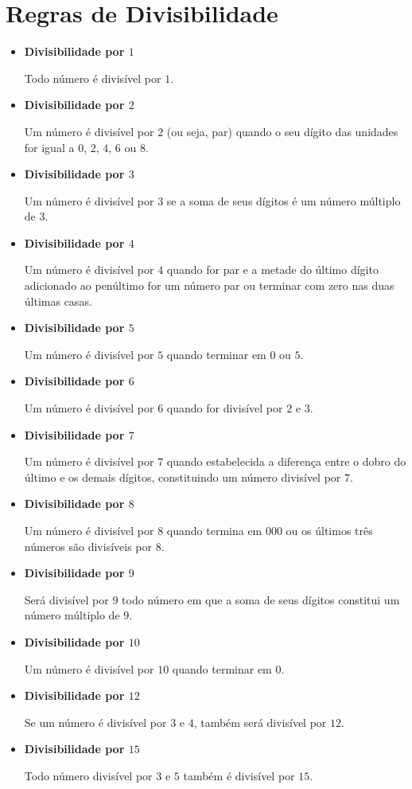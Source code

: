  \newpage
 \section{Regras de Divisibilidade}
 \begin{itemize}
  \item \textbf{Divisibilidade por $1$}

 Todo número é divisível por $1$.

 \item \textbf{Divisibilidade por $2$}

 Um número é divisível por $2$ (ou seja, par) quando o seu dígito das unidades for igual a $0$, $2$, $4$, $6$ ou $8$.

 \item \textbf{Divisibilidade por $3$}

 Um número é divisível por $3$ se a soma de seus dígitos é um número múltiplo de $3$.

 \item \textbf{Divisibilidade por $4$}

 Um número é divisível por $4$ quando for par e a metade do último dígito adicionado ao penúltimo for um número par ou terminar com zero nas duas últimas casas.

 \item \textbf{Divisibilidade por $5$}

 Um número é divisível por $5$ quando terminar em $0$ ou $5$.

 \item \textbf{Divisibilidade por $6$}

 Um número é divisível por $6$ quando for divisível por $2$ e $3$.

 \item \textbf{Divisibilidade por $7$}

 Um número é divisível por $7$ quando estabelecida a diferença entre o dobro do último e os demais dígitos, constituindo um número divisível por $7$.

 \item \textbf{Divisibilidade por $8$}

 Um número é divisível por $8$ quando termina em $000$ ou os últimos três números são divisíveis por $8$.

 \item \textbf{Divisibilidade por $9$}

 Será divisível por $9$ todo número em que a soma de seus dígitos constitui um número múltiplo de $9$.

 \item \textbf{Divisibilidade por $10$}

 Um número é divisível por $10$ quando terminar em $0$.

 \item \textbf{Divisibilidade por $12$}

 Se um número é divisível por $3$ e $4$, também será divisível por $12$.

 \item \textbf{Divisibilidade por $15$}

 Todo número divisível por $3$ e $5$ também é divisível por $15$.
 \end{itemize}

